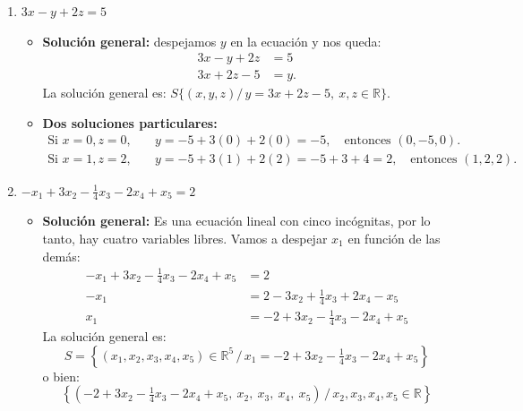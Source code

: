 \documentclass[11pt]{article}
\begin{document}
\begin{enumerate}[\hspace{-5mm} 1) ]
\begin{enumerate}
    

    \item $3x - y + 2z = 5$
    \begin{itemize}
        \item \textbf{Solución general:} despejamos  $y$ en la ecuación y nos queda:
        \begin{align*}
            3x - y + 2z &= 5 \\
            3x + 2z - 5 &= y .
        \end{align*}
        La solución general es: \qquad$S 
            \big\{(x, y, z) /\, y =  3x + 2z - 5, \ x, z \in \mathbb{R}\big\}. $  


\medskip 

        \item \textbf{Dos soluciones particulares:}
        \begin{align*}
            \text{Si } x = 0, z = 0, & \quad y = -5 + 3(0) + 2(0) = -5, \quad \text{entonces } (0, -5, 0). \\
            \text{Si } x = 1, z = 2, & \quad y = -5 + 3(1) + 2(2) = -5 + 3 + 4 = 2, \quad \text{entonces } (1, 2, 2).
        \end{align*}
    \end{itemize} 

\item $-x_1 + 3x_2 - \tfrac{1}{4}x_3 - 2x_4 + x_5 = 2$
    \begin{itemize}
        \item \textbf{Solución general:} 
        Es una ecuación lineal con cinco incógnitas, por lo tanto, hay cuatro variables libres. 
        Vamos a despejar \( x_1 \) en función de las demás:
        \begin{align*}
            -x_1 + 3x_2 - \tfrac{1}{4}x_3 - 2x_4 + x_5 &= 2 \\
            -x_1 &= 2 - 3x_2 + \tfrac{1}{4}x_3 + 2x_4 - x_5 \\
            x_1 &= -2 + 3x_2 - \tfrac{1}{4}x_3 - 2x_4 + x_5
        \end{align*}
        La solución general es:
        \[
            S = \left\{ (x_1, x_2, x_3, x_4, x_5) \in \mathbb{R}^5 \,\big/\, x_1 = -2 + 3x_2 - \tfrac{1}{4}x_3 - 2x_4 + x_5 \right\}
        \]
        o bien:
        \[
            \left\{ \left( -2 + 3x_2 - \tfrac{1}{4}x_3 - 2x_4 + x_5,\ x_2,\ x_3,\ x_4,\ x_5 \right) \,\big/\, x_2, x_3, x_4, x_5 \in \mathbb{R} \right\}
        \]


\medskip 
        

\end{itemize}
\end{enumerate}
\end{enumerate}
\end{document}
